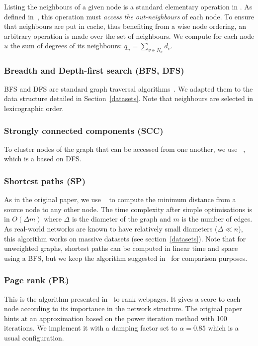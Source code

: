 Listing the neighbours of a given node is a standard elementary operation in \field.
%
As defined in~\cite{gorder}, this operation must \textit{access the out-neighbours} of each node. To ensure that neighbours are put in cache, thus benefiting from a wise node ordering, an arbitrary operation is made over the set of neighbours. We compute for each node $u$ the sum of degrees of its neighbours:
$q_u=\sum_{v\in N_u} d_v$.

\subsubsection{Breadth and Depth-first search (BFS, DFS)}
BFS and DFS are standard graph traversal algorithms~\cite{cormen}. We adapted them to the data structure detailed in Section~\ref{datasets}. Note that neighbours are selected in lexicographic order.

\subsubsection{Strongly connected components (SCC)}
To cluster nodes of the graph that can be accessed from one another, we use \tarjan~\cite{tarjan}, which is a based on DFS.

\subsubsection{Shortest paths (SP)}
As in the original paper, we use \bellman~\cite{cormen} to compute the minimum distance from a source node to any other node. The time complexity after simple optimisations is in $O(\Delta m)$ where $\Delta$ is the diameter of the graph and $m$ is the number of edges. 
%
As real-world networks are known to have relatively small diameters ($\Delta \ll n$), this algorithm works on massive datasets (see section~\ref{datasets}). 
%
Note that for unweighted graphs, shortest paths can be computed in linear time and space using a BFS, but we keep the algorithm suggested in~\cite{gorder} for comparison purposes.

\subsubsection{Page rank (PR)}
This is the algorithm presented in~\cite{pagerank} to rank webpages. It gives a score to each node according to its importance in the network structure.
%
The original paper hints at an approximation based on the power iteration method with 100 iterations. We implement it with a damping factor set to $\alpha=0.85$ which is a usual configuration.



